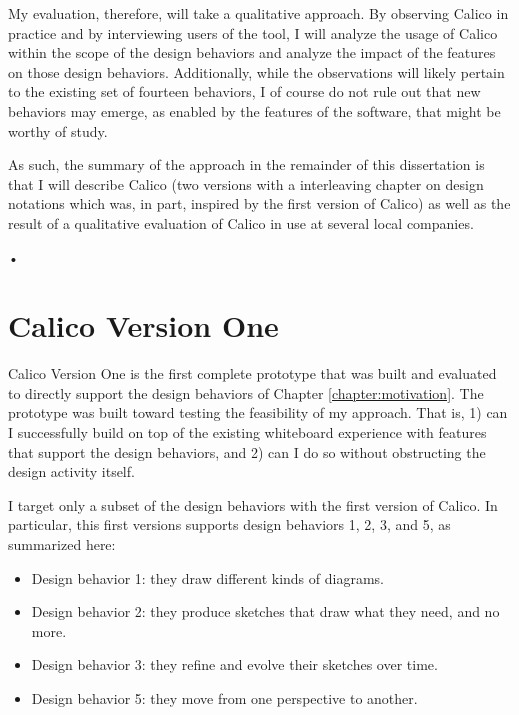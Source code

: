 \documentclass[12pt,fleqn]{ucithesis}
\begin{document}
My evaluation, therefore, will take a qualitative approach. By observing Calico in practice and by interviewing users of the tool, I will analyze the usage of Calico within the scope of the design behaviors and analyze the impact of the features on those design behaviors. Additionally, while the observations will likely pertain to the existing set of fourteen behaviors, I of course do not rule out that new behaviors may emerge, as enabled by the features of the software, that might be worthy of study. 

As such, the summary of the approach in the remainder of this dissertation is that I will describe Calico (two versions with a interleaving chapter on design notations which was, in part, inspired by the first version of Calico) as well as the result of a qualitative evaluation of Calico in use at several local companies.

 \newpage 
 \newpage \textsf{•}\chapter{Calico Version One}
\label{chapter:calico-version-one}

Calico Version One is the first complete prototype that was built and evaluated to directly support the design behaviors of Chapter \ref{chapter:motivation}. The prototype was built toward testing the feasibility of my approach. That is, 1) can I successfully build on top of the existing whiteboard experience with features that support the design behaviors, and 2) can I do so without obstructing the design activity itself.

I target only a subset of the design behaviors with the first version of Calico.  In particular, this first versions supports design behaviors 1, 2, 3, and 5, as summarized here:

\begin{itemize}
  \item Design behavior 1: they draw different kinds of diagrams.
  \item Design behavior 2: they produce sketches that draw what they need, and no more.
  \item Design behavior 3: they refine and evolve their sketches over time.
  \item Design behavior 5: they move from one perspective to another.
\end{itemize}
\end{document}
